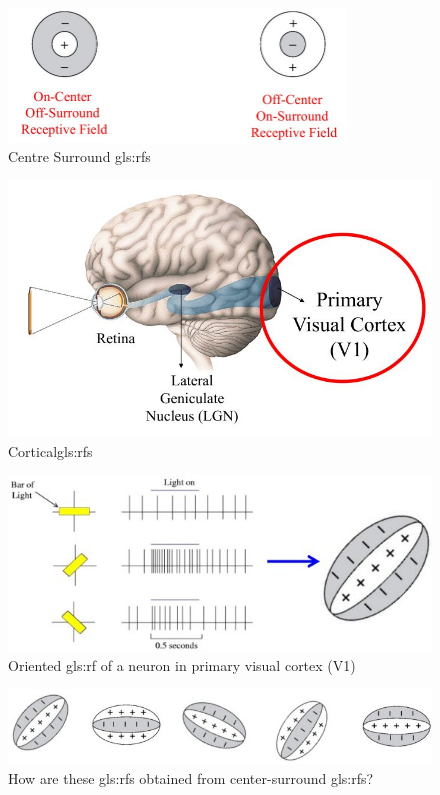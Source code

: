 \documentclass[]{article}
\begin{document}
\begin{figure}[H]
	\caption{Centre Surround \Glspl{gls:rf}}
	\includegraphics[width=0.8\textwidth]{center-surround}
\end{figure}

\begin{figure}[H]
	\caption{Cortical\Glspl{gls:rf}}
	\includegraphics[width=\textwidth]{CorticalReceptive Fields}
\end{figure}

\begin{figure}[H]
	\caption{Oriented \gls{gls:rf} of a neuron in primary visual cortex (V1)}
	\includegraphics[width=\textwidth]{orientation-preference}
\end{figure}

\begin{figure}[H]
	\caption[How are these oriented \glspl{gls:rf} obtained?]{How are these \glspl{gls:rf} obtained from center-surround \glspl{gls:rf}?}\label{fig:rf-shape}
	\includegraphics[width=\textwidth]{orientation-preference2}
\end{figure}
\end{document}
